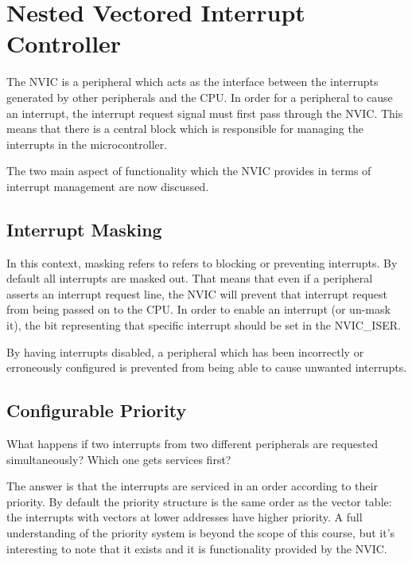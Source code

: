 \chapter{Nested Vectored Interrupt Controller}
The NVIC is a peripheral which acts as the interface between the interrupts generated by other peripherals and the CPU.
In order for a peripheral to cause an interrupt, the interrupt request signal must first pass through the NVIC.
This means that there is a central block which is responsible for managing the interrupts in the microcontroller.

The two main aspect of functionality which the NVIC provides in terms of interrupt management are now discussed.

\section{Interrupt Masking}
In this context, masking refers to refers to blocking or preventing interrupts.
By default all interrupts are masked out.
That means that even if a peripheral asserts an interrupt request line, the NVIC will prevent that interrupt request from being passed on to the CPU.
In order to enable an interrupt (or un-mask it), the bit representing that specific interrupt should be set in the NVIC\_ISER.

By having interrupts disabled, a peripheral which has been incorrectly or erroneously configured is prevented from being able to cause unwanted interrupts. 

\section{Configurable Priority}
What happens if two interrupts from two different peripherals are requested simultaneously? Which one gets services first?

The answer is that the interrupts are serviced in an order according to their priority. 
By default the priority structure is the same order as the vector table: the interrupts with vectors at lower addresses have higher priority. 
A full understanding of the priority system is beyond the scope of this course, but it's interesting to note that it exists and it is functionality provided by the NVIC.
